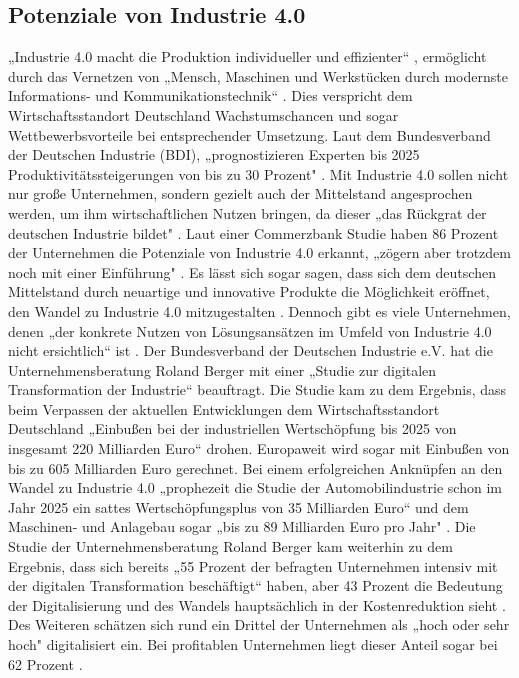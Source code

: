 \subsection{Potenziale von Industrie 4.0}\label{sec:PotentialeIndustrie4.0}
„Industrie 4.0 macht die Produktion individueller und effizienter“ \cite{6}, ermöglicht durch das Vernetzen von „Mensch, Maschinen und Werkstücken durch modernste Informations- und Kommunikationstechnik“ \cite{6}. Dies verspricht dem Wirtschaftsstandort Deutschland Wachstumschancen und sogar Wettbewerbsvorteile bei entsprechender Umsetzung. Laut dem Bundesverband der Deutschen Industrie (BDI), „prognostizieren Experten bis 2025 Produktivitätssteigerungen von bis zu 30 Prozent" \cite{6}.
\newline
Mit Industrie 4.0 sollen nicht nur große Unternehmen, sondern gezielt auch der Mittelstand angesprochen werden, um ihm wirtschaftlichen Nutzen bringen, da dieser „das Rückgrat der deutschen Industrie bildet" \cite[S.4]{2}. Laut einer Commerzbank Studie haben 86 Prozent der Unternehmen die Potenziale von Industrie 4.0 erkannt, „zögern aber trotzdem noch mit einer Einführung" \cite[S.4]{2}. Es lässt sich sogar sagen, dass sich dem deutschen Mittelstand durch neuartige und innovative Produkte die Möglichkeit eröffnet, den Wandel zu Industrie 4.0 mitzugestalten \cite[S.8]{2}. Dennoch gibt es viele Unternehmen, denen „der konkrete Nutzen von Lösungsansätzen im Umfeld von Industrie 4.0 nicht ersichtlich“ ist \cite[S.7]{2}. 
\newline
Der Bundesverband der Deutschen Industrie e.V. hat die Unternehmensberatung Roland Berger mit einer „Studie zur digitalen Transformation der Industrie“ \cite{8} beauftragt. Die Studie kam zu dem Ergebnis, dass beim Verpassen der aktuellen Entwicklungen dem Wirtschaftsstandort Deutschland „Einbußen bei der industriellen Wertschöpfung bis 2025 von insgesamt 220 Milliarden Euro“ \cite{8} drohen. Europaweit wird sogar mit Einbußen von bis zu 605 Milliarden Euro gerechnet. Bei einem erfolgreichen Anknüpfen an den Wandel zu Industrie 4.0 „prophezeit die Studie der Automobilindustrie schon im Jahr 2025 ein sattes Wertschöpfungsplus von 35 Milliarden Euro“ \cite{8} und dem Maschinen- und Anlagebau sogar „bis zu 89 Milliarden Euro pro Jahr" \cite{8}. Die Studie der Unternehmensberatung Roland Berger kam weiterhin zu dem Ergebnis, dass sich bereits „55 Prozent der befragten Unternehmen intensiv mit der digitalen Transformation beschäftigt“ \cite{8} haben, aber 43 Prozent die Bedeutung der Digitalisierung und des Wandels hauptsächlich in der Kostenreduktion sieht \cite{8}. Des Weiteren schätzen sich rund ein Drittel der Unternehmen als „hoch oder sehr hoch" \cite{8} digitalisiert ein. Bei profitablen Unternehmen liegt dieser Anteil sogar bei 62 Prozent \cite{8}.
